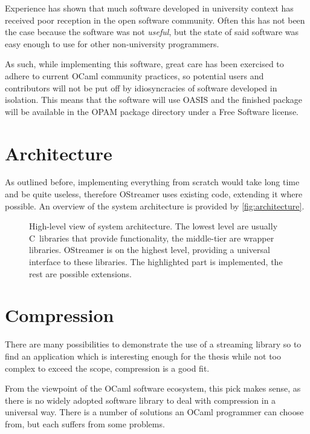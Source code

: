 \documentclass[parskip=half]{scrreprt}
\begin{document}
Experience has shown that much software developed in university context has
received poor reception in the open software community. Often this has not been
the case because the software was not \emph{useful}, but the state of said
software was easy enough to use for other non-university programmers.

As such, while implementing this software, great care has been exercised to
adhere to current OCaml community practices, so potential users and
contributors will not be put off by idiosyncracies of software developed in
isolation. This means that the software will use OASIS and the finished package
will be available in the OPAM package directory under a Free Software license.

\section{Architecture}
\label{sec:architecture}

As outlined before, implementing everything from scratch would take long time
and be quite useless, therefore OStreamer uses existing code, extending it
where possible. An overview of the system architecture is provided by
\autoref{fig:architecture}.

\begin{figure}[h]
  \centering
  
  \caption{High-level view of system architecture. The lowest level are usually
    C~libraries that provide functionality, the middle-tier are wrapper
    libraries. OStreamer is on the highest level, providing a universal interface
    to these libraries. The highlighted part is implemented, the rest are
    possible extensions.}
  \label{fig:architecture}
\end{figure}

\section{Compression}
\label{sec:compression}

There are many possibilities to demonstrate the use of a streaming library so
to find an application which is interesting enough for the thesis while not too
complex to exceed the scope, compression is a good fit.

From the viewpoint of the OCaml software ecosystem, this pick makes sense, as
there is no widely adopted software library to deal with compression in a
universal way. There is a number of solutions an OCaml programmer can choose
from, but each suffers from some problems.
\end{document}
